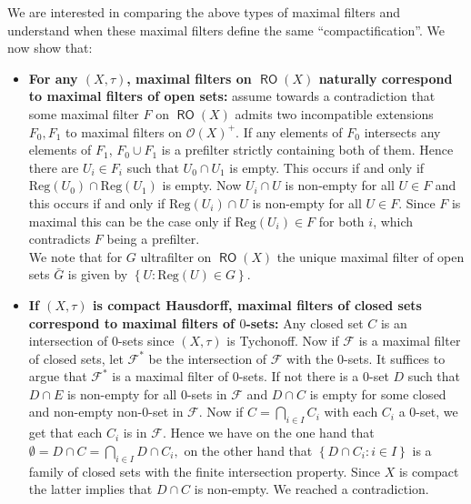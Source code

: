 \documentclass[11pt]{amsart}
\newcommand{\F}{\mathcal{F}}
\theoremstyle{plain}
\theoremstyle{definition}
\theoremstyle{plain}
\theoremstyle{remark}
\DeclareMathOperator{\RO}{\mathsf{RO}}
\DeclareMathOperator{\CLOP}{\mathsf{CLOP}}
\newcommand{\Reg}[1]{\mathrm{Reg}\left(#1\right)}
\newcommand{\bp}[1]{\left\lbrace #1 \right\rbrace}
\newcommand{\0}{\mathsf{0}}
\renewcommand{\1}{\mathsf{1}}
\renewcommand{\2}{\mathsf{2}}
\theoremstyle{definition}
\begin{document}
We are interested in comparing the above types of maximal filters and understand when these maximal filters define the same ``compactification''.
We now show that:
\begin{itemize} 
\item\textbf{For any $(X,\tau)$, maximal filters on $\RO(X)$ naturally correspond to maximal filters of open sets:}
 assume towards a contradiction that some maximal filter $F$ on $\RO(X)$ admits two incompatible extensions $F_0,F_1$ to maximal filters on $\mathcal{O}(X)^+$.
If any elements of $F_0$ intersects any elements of $F_1$, $F_0\cup F_1$ is a prefilter strictly containing both of them. Hence there are $U_i\in F_i$ such that $U_0\cap U_1$ is empty.
This occurs if and only if $\Reg{U_0}\cap\Reg{U_1}$ is empty.
Now $U_i\cap U$ is non-empty for all $U\in F$ and
this occurs if and only if $\Reg{U_i}\cap U$ is non-empty for all $U\in F$. Since $F$ is maximal this can be the case only if $\Reg{U_i}\in  F$ for both $i$, which contradicts $F$ being a prefilter.\\
We note that for $G$ ultrafilter on $\RO(X)$ the unique maximal filter of open sets $\bar{G}$ is given by 
$\bp{U:\Reg{U}\in G}$.
\item\textbf{If $(X,\tau)$ is compact Hausdorff, maximal filters of closed sets correspond to maximal filters of $0$-sets:}
Any closed set $C$ is an intersection of $0$-sets since $(X,\tau)$ is Tychonoff.
Now if $\F$ is a maximal filter of closed sets, let $\F^*$ be the intersection of $\F$ with the $0$-sets.
It suffices to argue that $\F^*$ is a maximal filter of $0$-sets. If not there is a $0$-set $D$ such that
$D\cap E$ is non-empty for all $0$-sets in $\F$ and $D\cap C$ is empty for some closed and non-empty 
non-$0$-set in $\F$. Now if $C=\bigcap_{i\in I}C_i$ with each $C_i$ a $0$-set, we get that each $C_i$ is in $\F$. Hence we have on the one hand that
\(
\emptyset=D\cap C=\bigcap_{i\in I} D\cap C_i,
\)
on the other hand that $\bp{D\cap C_i:i\in I}$ is a family of closed sets with the finite intersection property. Since $X$ is compact the latter implies that $D\cap C$ is non-empty. We reached a contradiction.


\end{itemize}
\end{document}
